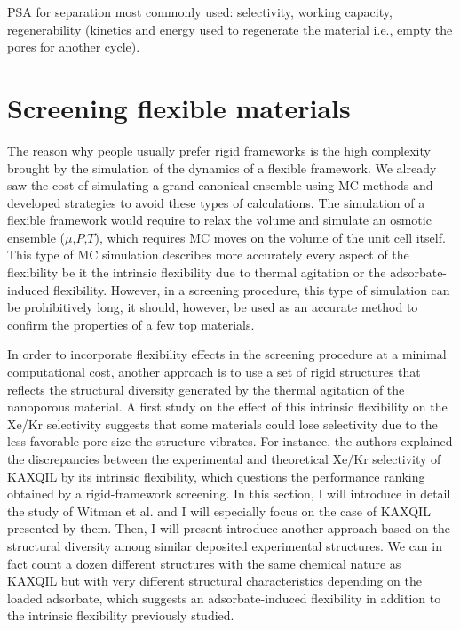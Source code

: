\documentclass[main]{subfiles}
\begin{document}
PSA for separation most commonly used: selectivity, working capacity, regenerability (kinetics and energy used to regenerate the material i.e., empty the pores for another cycle).\autocite{Kumar_1994}

\section{Screening flexible materials}

The reason why people usually prefer rigid frameworks is the high complexity brought by the simulation of the dynamics of a flexible framework. We already saw the cost of simulating a grand canonical ensemble using MC methods and developed strategies to avoid these types of calculations. The simulation of a flexible framework would require to relax the volume and simulate an osmotic ensemble ($\mu$,$P$,$T$), which requires MC moves on the volume of the unit cell itself.\autocite{Bousquet2012} This type of MC simulation describes more accurately every aspect of the flexibility be it the intrinsic flexibility due to thermal agitation or the adsorbate-induced flexibility. However, in a screening procedure, this type of simulation can be prohibitively long, it should, however, be used as an accurate method to confirm the properties of a few top materials. 

In order to incorporate flexibility effects in the screening procedure at a minimal computational cost, another approach is to use a set of rigid structures that reflects the structural diversity generated by the thermal agitation of the nanoporous material. A first study on the effect of this intrinsic flexibility on the Xe/Kr selectivity suggests that some materials could lose selectivity due to the less favorable pore size the structure vibrates.\autocite{Witman_2017} For instance, the authors explained the discrepancies between the experimental and theoretical Xe/Kr selectivity of KAXQIL\autocite{KAXQIL} by its intrinsic flexibility, which questions the performance ranking obtained by a rigid-framework screening. In this section, I will introduce in detail the study of Witman et al.\autocite{Witman_2017} and I will especially focus on the case of KAXQIL presented by them. Then, I will present introduce another approach based on the structural diversity among similar deposited experimental structures. We can in fact count a dozen different structures with the same chemical nature as KAXQIL but with very different structural characteristics depending on the loaded adsorbate, which suggests an adsorbate-induced flexibility in addition to the intrinsic flexibility previously studied. 
\end{document}
